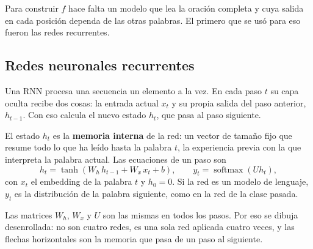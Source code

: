 \documentclass[11pt,letterpaper]{article}
\begin{document}
Para construir $f$ hace falta un modelo que lea la oración completa y
cuya salida en cada posición dependa de las otras palabras. El primero
que se usó para eso fueron las redes recurrentes.


\subsection*{Redes neuronales recurrentes}

\begin{definicion}
    Una RNN procesa una secuencia un elemento a la vez. En cada paso
    $t$ su capa oculta recibe dos cosas: la entrada actual $x_t$ y su
    propia salida del paso anterior, $h_{t-1}$. Con eso calcula el
    nuevo estado $h_t$, que pasa al paso siguiente.
\end{definicion}

El estado $h_t$ es la \textbf{memoria interna} de la red: un vector de
tamaño fijo que resume todo lo que ha leído hasta la palabra $t$, la
experiencia previa con la que interpreta la palabra actual. Las
ecuaciones de un paso son
\[
    h_t = \tanh\!\left(W_h\, h_{t-1} + W_x\, x_t + b\right) ,
    \qquad
    y_t = \operatorname{softmax}\!\left(U h_t\right) ,
\]
con $x_t$ el embedding de la palabra $t$ y $h_0 = 0$. Si la red es un
modelo de lenguaje, $y_t$ es la distribución de la palabra siguiente,
como en la red de la clase pasada.

Las matrices $W_h$, $W_x$ y $U$ son las mismas en todos los pasos. Por
eso se dibuja desenrollada: no son cuatro redes, es una sola red
aplicada cuatro veces, y las flechas horizontales son la memoria que
pasa de un paso al siguiente.

\begin{center}
\end{center}
\end{document}

